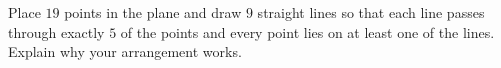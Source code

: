 Place $19$ points in the plane and draw $9$ straight lines so that each line passes through exactly $5$ of the points and every point lies on at least one of the lines. Explain why your arrangement works.
